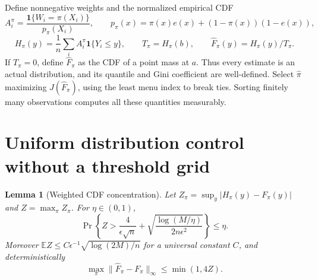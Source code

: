 \documentclass[11pt]{article}
\newtheorem{lemma}[theorem]{Lemma}
\theoremstyle{remark}
\newcommand{\E}{\mathbb E}
\newcommand{\Ind}{\mathbf 1}
\begin{document}
Define nonnegative weights and the normalized empirical CDF
\[
 A_i^\pi=\frac{\Ind\{W_i=\pi(X_i)\}}{p_\pi(X_i)},\qquad
 p_\pi(x)=\pi(x)e(x)+(1-\pi(x))(1-e(x)),
\]
\[
 H_\pi(y)=\frac1n\sum_i A_i^\pi\Ind\{Y_i\leq y\},\qquad
 T_\pi=H_\pi(b),\qquad \widehat F_\pi(y)=H_\pi(y)/T_\pi. \tag{1}
\]
If $T_\pi=0$, define $\widehat F_\pi$ as the CDF of a point mass at $a$.
Thus every estimate is an actual distribution, and its quantile and Gini
coefficient are well-defined. Select $\widehat\pi$ maximizing
$J(\widehat F_\pi)$, using the least menu index to break ties. Sorting
finitely many observations computes all these quantities measurably.

\section{Uniform distribution control without a threshold grid}
\begin{lemma}[Weighted CDF concentration]
Let
$Z_\pi=\sup_y|H_\pi(y)-F_\pi(y)|$ and $Z=\max_\pi Z_\pi$.
For $\eta\in(0,1)$,
\[
 \Pr\left\{Z>\frac4{\epsilon\sqrt n}
           +\sqrt{\frac{\log(M/\eta)}{2n\epsilon^2}}\right\}\leq\eta.
 \tag{2}
\]
Moreover $\E Z\leq C\epsilon^{-1}\sqrt{\log(2M)/n}$ for a universal
constant $C$, and deterministically
\[
 \max_\pi\|\widehat F_\pi-F_\pi\|_\infty\leq\min(1,4Z). \tag{3}
\]
\end{lemma}
\end{document}
